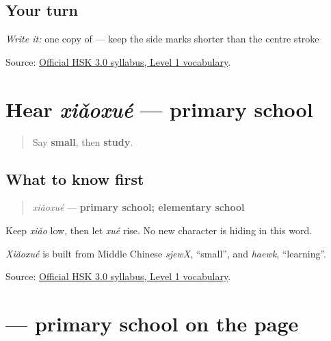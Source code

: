 \subsection*{Your turn}
\emph{Write it:} one copy of \textbf{} — keep the side marks shorter than the centre stroke

\begin{tcolorbox}[breakable,colback=teal!4,colframe=teal!35!black,title={Before you move on}]
Source: \href{https://hsk.cn-bj.ufileos.com/3.0/\%E6\%96\%B0\%E7\%89\%88HSK\%E8\%80\%83\%E8\%AF\%95\%E5\%A4\%A7\%E7\%BA\%B21219.pdf}{Official HSK 3.0 syllabus, Level 1 vocabulary}.
\end{tcolorbox}
\section[xiǎoxué]{Hear \emph{xiǎoxué} — primary school}

\label{lesson:ZH-C14-hear-xiaoxue}



\begin{quote}
Say \textbf{small}, then \textbf{study}.
\end{quote}

\subsection*{What to know first}
\begin{quote}
\emph{xiǎoxué} — \textbf{primary school; elementary school}
\end{quote}

Keep \emph{xiǎo} low, then let \emph{xué} rise. No new character is hiding in this word.

\emph{Xiǎoxué} is built from Middle Chinese \emph{sjewX}, \textquotedblleft{}small\textquotedblright{}, and \emph{haewk}, \textquotedblleft{}learning\textquotedblright{}.

\begin{tcolorbox}[breakable,colback=teal!4,colframe=teal!35!black,title={Before you move on}]
Source: \href{https://hsk.cn-bj.ufileos.com/3.0/\%E6\%96\%B0\%E7\%89\%88HSK\%E8\%80\%83\%E8\%AF\%95\%E5\%A4\%A7\%E7\%BA\%B21219.pdf}{Official HSK 3.0 syllabus, Level 1 vocabulary}.
\end{tcolorbox}
\section[\texorpdfstring{\zh{小学} (xiǎoxué)}{小学 (xiǎoxué)}]{ — primary school on the page}


